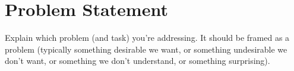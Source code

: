\section*{Problem Statement}

Explain which problem (and task) you're addressing.
It should be framed as a problem (typically something desirable we want, or something undesirable we don't want, or something we don't understand, or something surprising).
